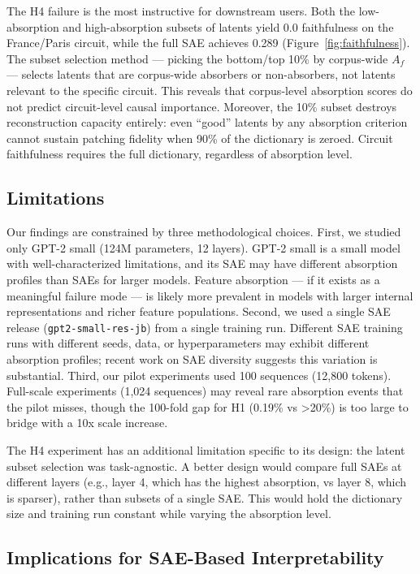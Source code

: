 \documentclass{article}
\begin{document}
The H4 failure is the most instructive for downstream users. Both the low-absorption and high-absorption subsets of latents yield 0.0 faithfulness on the France/Paris circuit, while the full SAE achieves 0.289 (Figure~\ref{fig:faithfulness}). The subset selection method --- picking the bottom/top 10\% by corpus-wide $A_f$ --- selects latents that are corpus-wide absorbers or non-absorbers, not latents relevant to the specific circuit. This reveals that corpus-level absorption scores do not predict circuit-level causal importance. Moreover, the 10\% subset destroys reconstruction capacity entirely: even ``good'' latents by any absorption criterion cannot sustain patching fidelity when 90\% of the dictionary is zeroed. Circuit faithfulness requires the full dictionary, regardless of absorption level.

\subsection{Limitations}

Our findings are constrained by three methodological choices. First, we studied only GPT-2 small (124M parameters, 12 layers). GPT-2 small is a small model with well-characterized limitations, and its SAE may have different absorption profiles than SAEs for larger models. Feature absorption --- if it exists as a meaningful failure mode --- is likely more prevalent in models with larger internal representations and richer feature populations. Second, we used a single SAE release (\texttt{gpt2-small-res-jb}) from a single training run. Different SAE training runs with different seeds, data, or hyperparameters may exhibit different absorption profiles; recent work on SAE diversity suggests this variation is substantial. Third, our pilot experiments used 100 sequences (12,800 tokens). Full-scale experiments (1,024 sequences) may reveal rare absorption events that the pilot misses, though the 100-fold gap for H1 (0.19\% vs >20\%) is too large to bridge with a 10x scale increase.

The H4 experiment has an additional limitation specific to its design: the latent subset selection was task-agnostic. A better design would compare full SAEs at different layers (e.g., layer 4, which has the highest absorption, vs layer 8, which is sparser), rather than subsets of a single SAE. This would hold the dictionary size and training run constant while varying the absorption level.

\subsection{Implications for SAE-Based Interpretability}
\end{document}
